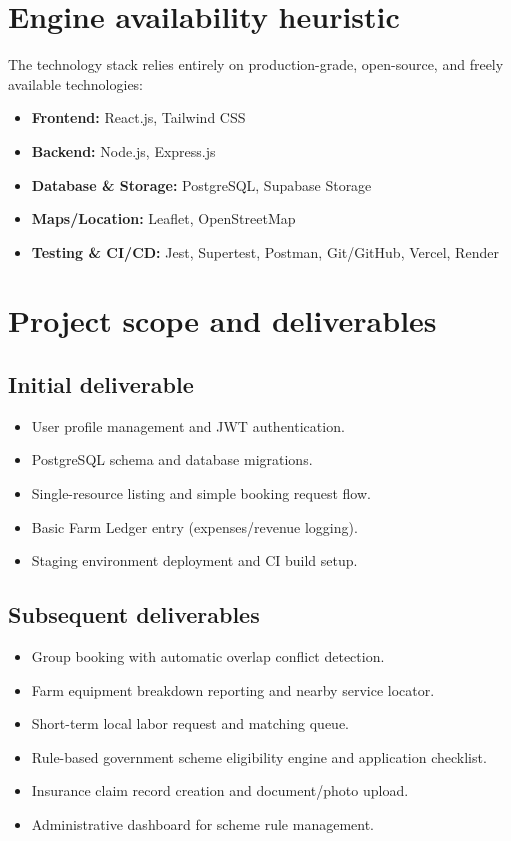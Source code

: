 \documentclass[11pt,a4paper]{article}
\begin{document}
\section{Engine availability heuristic}
The technology stack relies entirely on production-grade, open-source, and freely available technologies:
\begin{itemize}[leftmargin=*]
    \item \textbf{Frontend:} React.js, Tailwind CSS
    \item \textbf{Backend:} Node.js, Express.js
    \item \textbf{Database \& Storage:} PostgreSQL, Supabase Storage
    \item \textbf{Maps/Location:} Leaflet, OpenStreetMap
    \item \textbf{Testing \& CI/CD:} Jest, Supertest, Postman, Git/GitHub, Vercel, Render
\end{itemize}

\section{Project scope and deliverables}

\subsection{Initial deliverable}
\begin{itemize}[leftmargin=*]
    \item User profile management and JWT authentication.
    \item PostgreSQL schema and database migrations.
    \item Single-resource listing and simple booking request flow.
    \item Basic Farm Ledger entry (expenses/revenue logging).
    \item Staging environment deployment and CI build setup.
\end{itemize}

\subsection{Subsequent deliverables}
\begin{itemize}[leftmargin=*]
    \item Group booking with automatic overlap conflict detection.
    \item Farm equipment breakdown reporting and nearby service locator.
    \item Short-term local labor request and matching queue.
    \item Rule-based government scheme eligibility engine and application checklist.
    \item Insurance claim record creation and document/photo upload.
    \item Administrative dashboard for scheme rule management.
\end{itemize}
\end{document}
